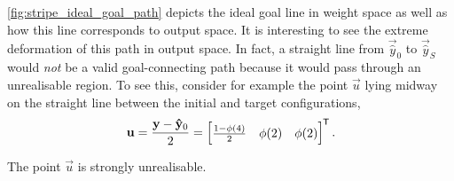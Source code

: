 \ref{fig:stripe_ideal_goal_path} depicts the ideal goal line in weight space as well as how this line corresponds to output space.
It is interesting to see the extreme deformation of this path in output space. 
In fact, a straight line from $\vec{\hat{y}}_0$ to $\vec{\hat{y}}_S$ would \textit{not} be a valid goal-connecting path because it would pass through an unrealisable region.
To see this, consider for example the point $\vec{u}$ lying midway on the straight line between the initial and target configurations,
\begin{equation*}
    \mathbf{u}=
    \frac{\mathbf{y}-\mathbf{\hat{y}}_0}{2}=
    \begin{bmatrix}
        \frac{1-\phi(4)}{2} & \phi(2) & \phi(2)
    \end{bmatrix}^{\mkern-1.5mu\mathsf{T}}.
\end{equation*}
\begin{lemma}
    \label{lmm:stripe_unrealisable_point}
    The point $\vec{u}$ is strongly unrealisable.
\end{lemma}

